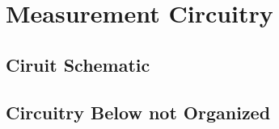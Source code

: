 \section {Measurement Circuitry}

\subsection{Ciruit Schematic}

\subsection{Circuitry Below not Organized}

